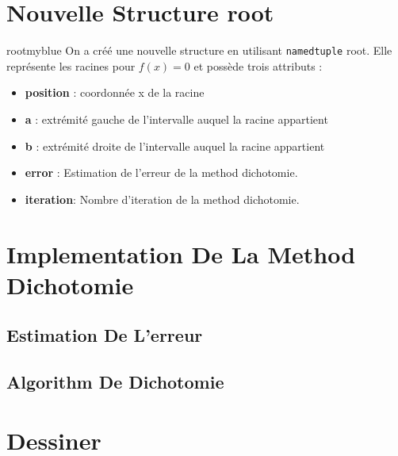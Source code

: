 \section{Nouvelle Structure root}
\begin{prettyBox}{root}{myblue}
On a créé une nouvelle structure en utilisant \texttt{namedtuple} root. Elle représente 
les racines pour \( f(x) = 0 \) et possède trois attributs :
\begin{itemize}
    \item \textbf{position} : coordonnée x de la racine
    \item \textbf{a} : extrémité gauche de l'intervalle auquel la racine appartient
    \item \textbf{b} : extrémité droite de l'intervalle auquel la racine appartient
    \item \textbf{error} : Estimation de l'erreur de la method dichotomie.
    \item \textbf{iteration}: Nombre d'iteration de la method dichotomie.
\end{itemize}
\end{prettyBox}
\vspace{0.5cm}


\vspace{1cm}

\section{Implementation De La Method Dichotomie}
\subsection{Estimation De L'erreur}


\vspace{0.5cm}
\subsection{Algorithm De Dichotomie}


\newpage
\section{Dessiner}
